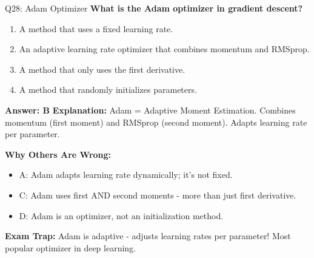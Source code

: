 \documentclass[8pt]{beamer}
\begin{document}
	\begin{frame}{Q28: Adam Optimizer}
		\fontsize{6.5}{7.5}\selectfont
		\textbf{What is the Adam optimizer in gradient descent?}
		
		\begin{enumerate}
			\item A method that uses a fixed learning rate.
			\item An adaptive learning rate optimizer that combines momentum and RMSprop.
			\item A method that only uses the first derivative.
			\item A method that randomly initializes parameters.
		\end{enumerate}
		
		\vspace{0.05cm}
		\textcolor{myblue}{\textbf{Answer: B}}
		\vspace{0.05cm}
		\textcolor{myblue}{\textbf{Explanation:}} Adam = Adaptive Moment Estimation. Combines momentum (first moment) and RMSprop (second moment). Adapts learning rate per parameter.
		
		\vspace{0.05cm}
		\textcolor{myred}{\textbf{Why Others Are Wrong:}}
		\begin{itemize}
			\item \textcolor{myred}{A:} Adam adapts learning rate dynamically; it's not fixed.
			\item \textcolor{myred}{C:} Adam uses first AND second moments - more than just first derivative.
			\item \textcolor{myred}{D:} Adam is an optimizer, not an initialization method.
		\end{itemize}
		
		\textcolor{myred}{\textbf{Exam Trap:}} Adam is \textcolor{myblue}{adaptive} - adjusts learning rates per parameter! Most popular optimizer in deep learning.
	\end{frame}
	
\end{document}
